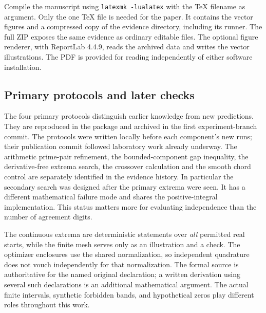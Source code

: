 \documentclass[12pt,letterpaper]{article}
\begin{document}
Compile the manuscript using \texttt{latexmk -lualatex} with the TeX filename as argument. Only the one TeX file is needed for the paper. It contains the vector figures and a compressed copy of the evidence directory, including its runner. The full ZIP exposes the same evidence as ordinary editable files. The optional figure renderer, with ReportLab 4.4.9, reads the archived data and writes the vector illustrations. The PDF is provided for reading independently of either software installation.

\subsection{Primary protocols and later checks}
The four primary protocols distinguish earlier knowledge from new predictions. They are reproduced in the package and archived in the first experiment-branch commit. The protocols were written locally before each component's new runs; their publication commit followed laboratory work already underway. The arithmetic prime-pair refinement, the bounded-component gap inequality, the derivative-free extrema search, the crossover calculation and the smooth chord control are separately identified in the evidence history. In particular the secondary search was designed after the primary extrema were seen. It has a different mathematical failure mode and shares the positive-integral implementation. This status matters more for evaluating independence than the number of agreement digits.

The continuous extrema are deterministic statements over \emph{all} permitted real starts, while the finite mesh serves only as an illustration and a check. The optimizer enclosures use the shared normalization, so independent quadrature does not vouch independently for that normalization. The formal source is authoritative for the named original declaration; a written derivation using several such declarations is an additional mathematical argument. The actual finite intervals, synthetic forbidden bands, and hypothetical zeros play different roles throughout this work.
\end{document}
